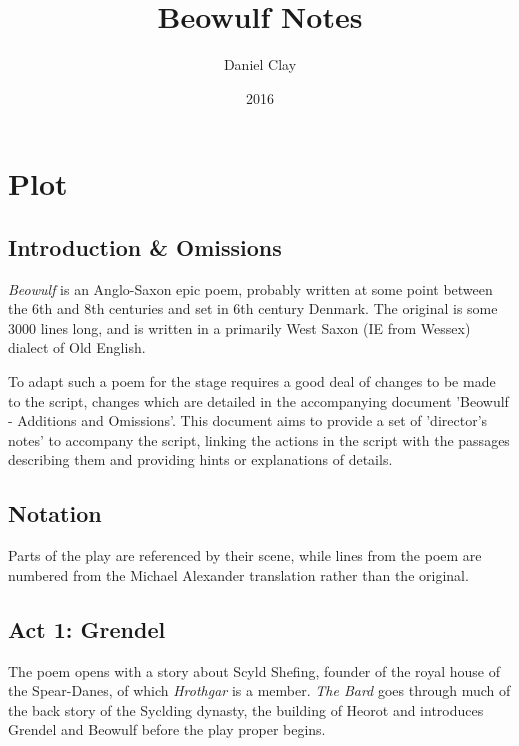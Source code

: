 \documentclass[a4paper]{article}
\begin{document}
\title{Beowulf Notes}
\date{2016}
\author{
Daniel Clay \\ 
}
\maketitle

\section{Plot}

\subsection{Introduction \& Omissions}%

\textit{Beowulf} is an Anglo-Saxon epic poem, probably written at some point 
between the 6th and 8th centuries and set in 6th century Denmark. The original
is some 3000 lines long, and is written in a primarily West Saxon (IE from Wessex)
dialect of Old English.

To adapt such a poem for the stage requires a good deal of changes to be made
to the script, changes which are detailed in the accompanying document
'Beowulf - Additions and Omissions'. This document aims to provide a set of
'director's notes' to accompany the script, linking the actions in the script
with the passages describing them and providing hints or explanations of details.

\subsection{Notation}%

Parts of the play are referenced by their scene, while lines from the poem are
numbered from the Michael Alexander translation rather than the original.

\subsection{Act 1: Grendel}%

The poem opens with a story about Scyld Shefing, founder of the royal house
of the Spear-Danes, of which \textit{Hrothgar} is a member. \textit{The Bard} 
goes through much of the back story of the Syclding dynasty, the building of Heorot
and introduces Grendel and Beowulf before the play proper begins.
\end{document}
